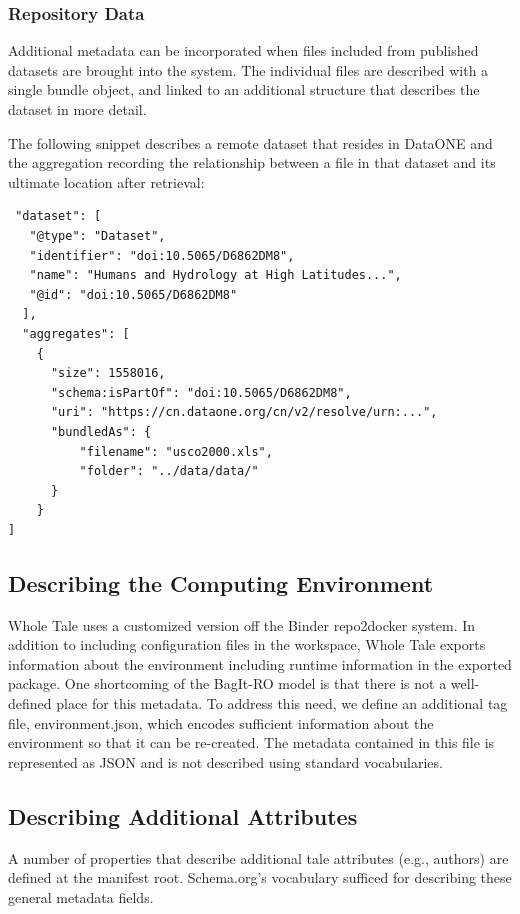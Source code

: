 \documentclass[conference]{IEEEtran}
\begin{document}
\subsubsection{Repository Data}
Additional metadata can be incorporated when files included from published datasets are brought into the system. The individual files are described with a single bundle object, and linked to an 
additional structure that describes the dataset in more detail.

The following snippet describes a remote dataset that resides in DataONE and the aggregation 
recording the relationship between a file in that dataset and its ultimate location after 
retrieval:


\begin{lstlisting}
 "dataset": [
   "@type": "Dataset",
   "identifier": "doi:10.5065/D6862DM8",
   "name": "Humans and Hydrology at High Latitudes...",
   "@id": "doi:10.5065/D6862DM8"
  ],
  "aggregates": [
    {
      "size": 1558016,
      "schema:isPartOf": "doi:10.5065/D6862DM8",
      "uri": "https://cn.dataone.org/cn/v2/resolve/urn:...",
      "bundledAs": {
          "filename": "usco2000.xls",
          "folder": "../data/data/"
      }
    }
]
\end{lstlisting}

\subsection{Describing the Computing Environment}
Whole Tale uses a customized version off the Binder repo2docker system. In addition to including 
configuration files in the workspace, Whole Tale exports information about the environment 
including runtime information in the exported package. One shortcoming of the BagIt-RO model is 
that there is not a well-defined place for this metadata. To address this need, we define an 
additional tag file, environment.json, which encodes sufficient information about the environment 
so that it can be re-created. The metadata contained in this file is represented as JSON and is 
not described using standard vocabularies. 

\subsection{Describing Additional Attributes}
A number of properties that describe additional tale attributes (e.g., authors) are defined at 
the manifest root. Schema.org's vocabulary sufficed for describing these general metadata fields.
\end{document}
